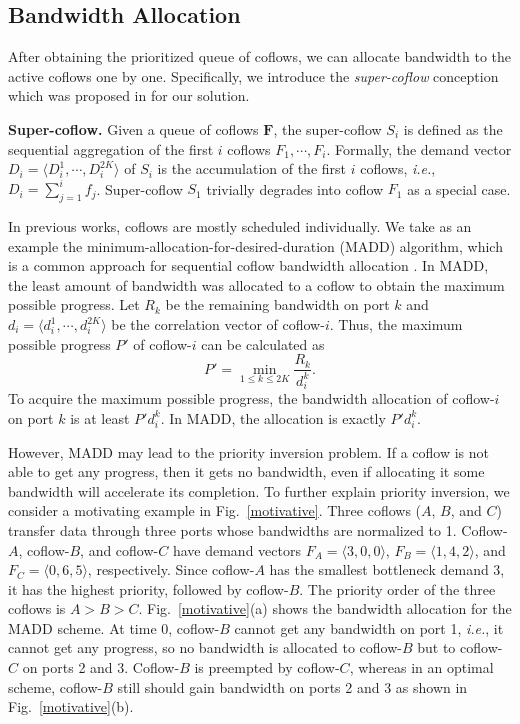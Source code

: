 \documentclass[10pt,journal,compsoc]{IEEEtran}
\begin{document}
\subsection{Bandwidth Allocation}
After obtaining the prioritized queue of coflows, we can allocate bandwidth to the active coflows one by one.
%
Specifically, we introduce the \emph{super-coflow} conception which was proposed in \cite{utopia} for our solution.

\noindent \textbf{Super-coflow.} Given a queue of coflows $\mathbf{F}$, the super-coflow $S_i$ is defined as the sequential aggregation of the first $i$ coflows $F_1,\cdots,F_i$.
%
Formally, the demand vector $D_i = \langle D_i^1,\cdots,D_i^{2K} \rangle$ of $S_i$ is the accumulation of the first $i$ coflows, \emph{i.e.}, $D_i = \sum_{j=1}^if_j$.
%
Super-coflow $S_1$ trivially degrades into coflow $F_1$ as a special case.

In previous works, coflows are mostly scheduled individually.
%
We take as an example the minimum-allocation-for-desired-duration (MADD) algorithm, which is a common approach for sequential coflow bandwidth allocation \cite{varys, orchestra}.
%
In MADD, the least amount of bandwidth was allocated to a coflow to obtain the maximum possible progress.
%
Let $R_k$ be the remaining bandwidth on port $k$ and $d_i=\langle d_i^1,\cdots,d_i^{2K}\rangle$ be the correlation vector of coflow-$i$.
%
Thus, the maximum possible progress $P'$ of coflow-$i$ can be calculated as
%
\begin{equation}
	P' = \min_{1\leq k \leq 2K}\frac{R_k}{d_i^k}.
\end{equation}
%
To acquire the maximum possible progress, the bandwidth allocation of coflow-$i$ on port $k$ is at least $P'd_i^k$.
%
In MADD, the allocation is exactly $P'd_i^k$.

However, MADD may lead to the priority inversion problem.
%
If a coflow is not able to get any progress, then it gets no bandwidth, even if allocating it some bandwidth will accelerate its completion.
%
To further explain priority inversion, we consider a motivating example in Fig.~\ref{motivative}.
%
Three coflows ($A$, $B$, and $C$) transfer data through three ports whose bandwidths are normalized to 1.
%
Coflow-$A$, coflow-$B$, and coflow-$C$ have demand vectors $F_A=\langle 3,0,0\rangle$, $F_B=\langle 1,4,2\rangle$, and $F_C=\langle 0,6,5\rangle$, respectively.
%
Since coflow-$A$ has the smallest bottleneck demand 3, it has the highest priority, followed by coflow-$B$.
%
The priority order of the three coflows is $A > B > C$.
%
Fig.~\ref{motivative}(a) shows the bandwidth allocation for the MADD scheme.
%
At time 0, coflow-$B$ cannot get any bandwidth on port 1, \emph{i.e.}, it cannot get any progress, so no bandwidth is allocated to coflow-$B$ but to coflow-$C$ on ports 2 and 3.
%
Coflow-$B$ is preempted by coflow-$C$, whereas in an optimal scheme, coflow-$B$ still should gain bandwidth on ports 2 and 3 as shown in Fig.~\ref{motivative}(b).
\end{document}
